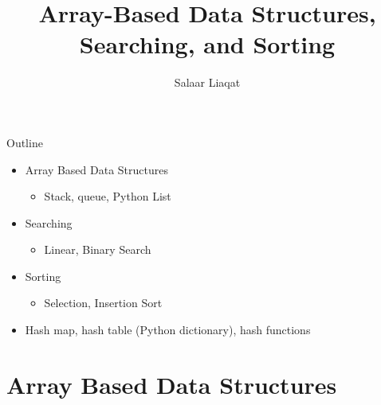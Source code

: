\documentclass[
  ignorenonframetext,
]{beamer}
\title{Array-Based Data Structures, Searching, and Sorting}
\author{Salaar Liaqat}
\date{}
\institute{Data Sciences Institute, UofT}
\providecommand{\tightlist}{%
  \setlength{\itemsep}{0pt}\setlength{\parskip}{0pt}}\usepackage{longtable,booktabs,array}
\begin{document}
\frame{\titlepage}
\ifdefined\Shaded\renewenvironment{Shaded}{\begin{tcolorbox}[sharp corners, boxrule=0pt, interior hidden, borderline west={3pt}{0pt}{shadecolor}, breakable, enhanced, frame hidden]}{\end{tcolorbox}}\fi

\begin{frame}{Outline}
\protect\hypertarget{outline}{}
\begin{itemize}
\item
  Array Based Data Structures

  \begin{itemize}
  \tightlist
  \item
    Stack, queue, Python List
  \end{itemize}
\item
  Searching

  \begin{itemize}
  \tightlist
  \item
    Linear, Binary Search
  \end{itemize}
\item
  Sorting

  \begin{itemize}
  \tightlist
  \item
    Selection, Insertion Sort
  \end{itemize}
\item
  Hash map, hash table (Python dictionary), hash functions
\end{itemize}
\end{frame}

\hypertarget{array-based-data-structures}{%
\section{Array Based Data
Structures}\label{array-based-data-structures}}
\end{document}
